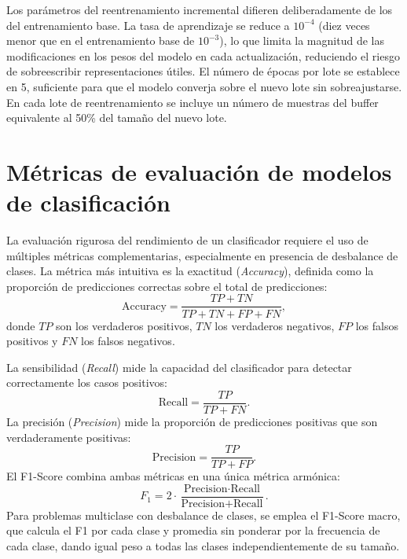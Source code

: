 Los parámetros del reentrenamiento incremental difieren deliberadamente de los del entrenamiento base. La tasa de aprendizaje se reduce a $10^{-4}$ (diez veces menor que en el entrenamiento base de $10^{-3}$), lo que limita la magnitud de las modificaciones en los pesos del modelo en cada actualización, reduciendo el riesgo de sobreescribir representaciones útiles. El número de épocas por lote se establece en 5, suficiente para que el modelo converja sobre el nuevo lote sin sobreajustarse. En cada lote de reentrenamiento se incluye un número de muestras del buffer equivalente al 50\% del tamaño del nuevo lote.

\section{Métricas de evaluación de modelos de clasificación}

La evaluación rigurosa del rendimiento de un clasificador requiere el uso de múltiples métricas complementarias, especialmente en presencia de desbalance de clases. La métrica más intuitiva es la exactitud (\textit{Accuracy}), definida como la proporción de predicciones correctas sobre el total de predicciones:
\begin{equation}
\text{Accuracy} = \frac{TP + TN}{TP + TN + FP + FN},
\end{equation}
donde $TP$ son los verdaderos positivos, $TN$ los verdaderos negativos, $FP$ los falsos positivos y $FN$ los falsos negativos.

La sensibilidad (\textit{Recall}) mide la capacidad del clasificador para detectar correctamente los casos positivos:
\begin{equation}
\text{Recall} = \frac{TP}{TP + FN}.
\end{equation}
La precisión (\textit{Precision}) mide la proporción de predicciones positivas que son verdaderamente positivas:
\begin{equation}
\text{Precision} = \frac{TP}{TP + FP}.
\end{equation}
El F1-Score combina ambas métricas en una única métrica armónica:
\begin{equation}
F_1 = 2 \cdot \frac{\text{Precision} \cdot \text{Recall}}{\text{Precision} + \text{Recall}}.
\end{equation}
Para problemas multiclase con desbalance de clases, se emplea el F1-Score macro, que calcula el F1 por cada clase y promedia sin ponderar por la frecuencia de cada clase, dando igual peso a todas las clases independientemente de su tamaño.


